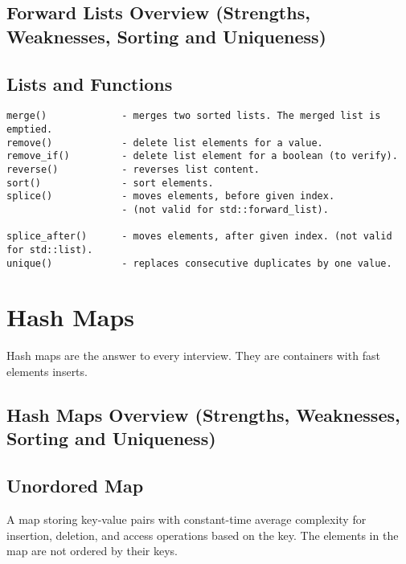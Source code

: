 \subsection{Forward Lists Overview (Strengths, Weaknesses, Sorting and Uniqueness)}

\subsection{Lists and Functions}

\begin{verbatim}
merge()             - merges two sorted lists. The merged list is emptied.
remove()            - delete list elements for a value.
remove_if()         - delete list element for a boolean (to verify).
reverse()           - reverses list content.
sort()              - sort elements.
splice()            - moves elements, before given index.
                    - (not valid for std::forward_list).

splice_after()      - moves elements, after given index. (not valid for std::list).
unique()            - replaces consecutive duplicates by one value.
\end{verbatim}

\section{Hash Maps}

Hash maps are the answer to every interview. They are containers with fast elements inserts.

\subsection{Hash Maps Overview (Strengths, Weaknesses, Sorting and Uniqueness)}

\subsection{Unordored Map}

A map storing key-value pairs with constant-time average complexity for insertion,
deletion, and access operations based on the key.
The elements in the map are not ordered by their keys.

